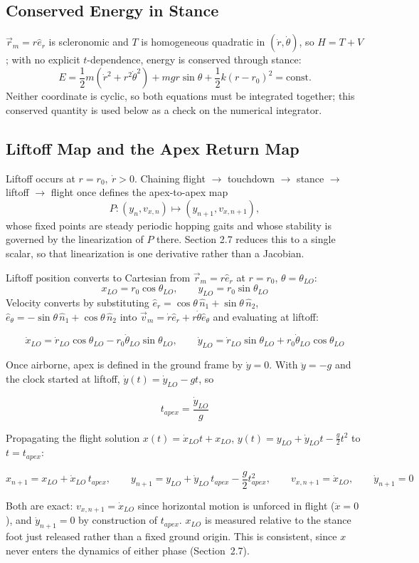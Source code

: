 \documentclass[11pt]{article}
\begin{document}
\subsection{Conserved Energy in Stance}
$\vec r_m=r\hat e_r$ is scleronomic and $T$ is homogeneous quadratic in
$(\dot r,\dot\theta)$, so $H=T+V$; with no explicit $t$-dependence,
energy is conserved through stance:
\[
    E = \frac12m(\dot r^2+r^2\dot\theta^2)+mgr\sin\theta
    +\frac12k(r-r_0)^2 = \text{const.}
\]
Neither coordinate is cyclic, so both equations must be integrated
together; this conserved quantity is used below as a check on the
numerical integrator.

\subsection{Liftoff Map and the Apex Return Map}
\label{sec:returnmap}
Liftoff occurs at $r=r_0,\ \dot r>0$. Chaining flight $\to$ touchdown
$\to$ stance $\to$ liftoff $\to$ flight once defines the apex-to-apex
map
\[
    P:(y_{n},v_{x,n})\mapsto(y_{n+1},v_{x,n+1}),
\]
whose fixed points are steady periodic hopping gaits and whose
stability is governed by the linearization of $P$ there. Section 2.7
reduces this to a single scalar, so that linearization is one
derivative rather than a Jacobian.

Liftoff position converts to Cartesian from $\vec r_m=r\hat e_r$ at
$r=r_0$, $\theta=\theta_{LO}$:
\[
    x_{LO}=r_0\cos\theta_{LO}, \qquad y_{LO}=r_0\sin\theta_{LO}
\]
Velocity converts by substituting $\hat e_r=\cos\theta\,\hat n_1+\sin\theta\,\hat n_2$,
$\hat e_\theta=-\sin\theta\,\hat n_1+\cos\theta\,\hat n_2$ into
$\vec v_m=\dot r\hat e_r+r\dot\theta\hat e_\theta$ and evaluating at
liftoff:
\begin{result}
\[
    \dot x_{LO}=\dot r_{LO}\cos\theta_{LO}-r_0\dot\theta_{LO}\sin\theta_{LO},
    \qquad
    \dot y_{LO}=\dot r_{LO}\sin\theta_{LO}+r_0\dot\theta_{LO}\cos\theta_{LO}
\]
\end{result}

Once airborne, apex is defined in the ground frame by $\dot y=0$. With
$\ddot y=-g$ and the clock started at liftoff, $\dot y(t)=\dot y_{LO}-gt$,
so
\begin{result}
\[
    t_{apex} = \frac{\dot y_{LO}}{g}
\]
\end{result}
Propagating the flight solution $x(t)=\dot x_{LO}t+x_{LO}$,
$y(t)=y_{LO}+\dot y_{LO}t-\tfrac g2t^2$ to $t=t_{apex}$:
\begin{result}
\[
    x_{n+1} = x_{LO}+\dot x_{LO}\,t_{apex}, \qquad
    y_{n+1} = y_{LO}+\dot y_{LO}\,t_{apex}-\frac g2t_{apex}^2, \qquad
    v_{x,n+1}=\dot x_{LO}, \qquad
    \dot y_{n+1}=0
\]
\end{result}
Both are exact: $v_{x,n+1}=\dot x_{LO}$ since horizontal motion is
unforced in flight ($\ddot x=0$), and $\dot y_{n+1}=0$ by construction
of $t_{apex}$. $x_{LO}$ is measured relative to the stance foot just
released rather than a fixed ground origin. This is consistent, since $x$
never enters the dynamics of either phase (Section~2.7).
\end{document}
